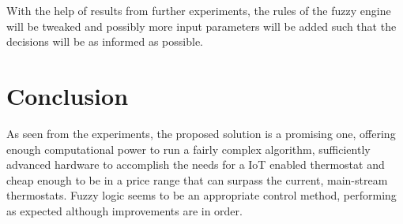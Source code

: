 \documentclass[conference]{IEEEtran}
\let\Oldsection\section
\renewcommand{\section}{\FloatBarrier\Oldsection}
\begin{document}
With the help of results from further experiments, the rules of the fuzzy engine will be tweaked and possibly
more input parameters will be added such that the decisions will be as informed as possible.

\section{Conclusion}
\label{Conclusion}

As seen from the experiments, the proposed solution is a promising one, offering enough computational power
to run a fairly complex algorithm, sufficiently advanced hardware to accomplish the needs for a IoT enabled
thermostat and cheap enough to be in a price range that can surpass the current, main-stream thermostats.
Fuzzy logic seems to be an appropriate control method, performing as expected although improvements are in
order.



\end{document}

